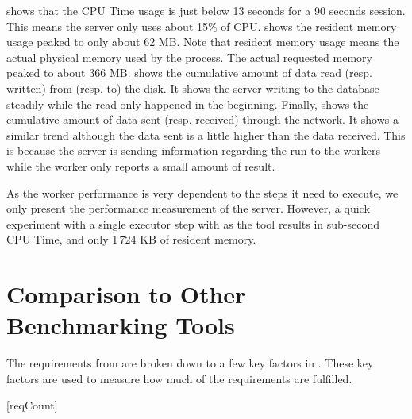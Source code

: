  shows that the CPU Time usage is just below 13 seconds for a 90 seconds session.
This means the server only uses about 15\% of CPU.
 shows the resident memory usage peaked to only about 62 MB.
Note that resident memory usage means the actual physical memory used by the process.
The actual requested memory peaked to about 366 MB.
 shows the cumulative amount of data read (resp. written) from (resp. to) the disk.
It shows the server writing to the database steadily while the read only happened in the beginning.
Finally,  shows the cumulative amount of data sent (resp. received) through the network.
It shows a similar trend although the data sent is a little higher than the data received.
This is because the server is sending information regarding the run to the workers while the worker only reports a small amount of result.

As the worker performance is very dependent to the steps it need to execute, we only present the performance measurement of the server.
However, a quick experiment with a single executor step with  as the tool results in sub-second CPU Time, and only 1\,724 KB of resident memory.


\section{Comparison to Other Benchmarking Tools}
\label{sec:eval.comparison}

The requirements from  are broken down to a few key factors in .
These key factors are used to measure how much of the requirements are fulfilled.

[reqCount]
\newcommand{\reqLabel}[1]{
	\setcounter{reqFactorCount}{0}
	\addtocounter{reqCount}{1}
	\arabic{reqCount}.
	#1
}
\newcommand{\reqFactor}[1]{
	\addtocounter{reqFactorCount}{1}
	(\alph{reqFactorCount}) #1
}

